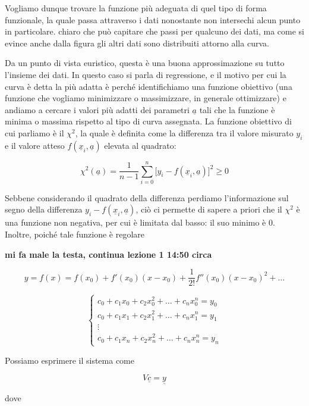 \vspace{0.4cm}Vogliamo dunque trovare la funzione più adeguata di quel tipo di forma funzionale, la quale passa attraverso i dati nonostante non intersechi alcun punto in particolare. \E chiaro che può capitare che passi per qualcuno dei dati, ma come si evince anche dalla figura gli altri dati sono distribuiti attorno alla curva.

Da un punto di vista euristico, questa è una buona approssimazione su tutto l'insieme dei dati. In questo caso si parla di regressione, e il motivo per cui la curva è detta la più adatta è perché identifichiamo una funzione obiettivo (una funzione che vogliamo minimizzare o massimizzare, in generale ottimizzare) e andiamo a cercare i valori più adatti dei parametri $\underline{a}$ tali che la funzione è minima o massima rispetto al tipo di curva assegnata. La funzione obiettivo di cui parliamo è il $\chi^2$, la quale è definita come la differenza tra il valore misurato $y_i$ e il valore atteso $f(\underline{x}_i,\underline{a})$ elevata al quadrato:

$$\chi^2(\underline{a})
=\frac{1}{n-1} \sum_{i=0}^{n} \big[ y_i - f(\underline{x}_i,\underline{a}) \big]^2\geq0$$

Sebbene considerando il quadrato della differenza perdiamo l'informazione sul segno della differenza $y_i - f(\underline{x}_i,\underline{a})$, ciò ci permette di sapere a priori che il $\chi^2$ è una funzione non negativa, per cui è limitata dal basso: il suo minimo è 0. Inoltre, poiché tale funzione è regolare

\textbf{mi fa male la testa, continua lezione 1 14:50 circa}

$$y=f(x)=f(x_0) + f'(x_0)(x-x_0) + \frac{1}{2!}f''(x_0)(x-x_0)^2 + \ldots$$

$$\begin{cases}
   c_0 + c_1x_0 + c_2 x_0^2 + \ldots + c_n x_0^n=y_0\\
   c_0 + c_1x_1 + c_2 x_1^2 + \ldots + c_n x_1^n=y_1\\
   \vdots\\
   c_0 + c_1x_n + c_2 x_n^2 + \ldots + c_n x_n^n=y_n
\end{cases}$$

Possiamo esprimere il sistema come

$$V \underline{c}=\underline{y}$$

dove


